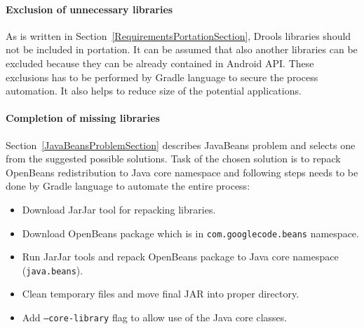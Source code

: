 \paragraph{Exclusion of unnecessary libraries}
As is written in Section~\ref{RequirementsPortationSection}, Drools libraries should not be included in portation. It
can be assumed that also another libraries can be excluded because they can be already contained in Android API. These
exclusions has to be performed by Gradle language to secure the process automation. It also helps to reduce size of the
potential applications.

\paragraph{Completion of missing libraries}
Section~\ref{JavaBeansProblemSection} describes JavaBeans problem and selects one from the suggested possible solutions.
Task of the chosen solution is to repack OpenBeans redistribution to Java core namespace and following steps needs to be
done by Gradle language to automate the entire process:
\begin{itemize}
\item Download JarJar tool for repacking libraries.
\item Download OpenBeans package which is in \texttt{com.googlecode.beans} namespace.
\item Run JarJar tools and repack OpenBeans package to Java core namespace (\texttt{java.beans}).
\item Clean temporary files and move final JAR into proper directory.
\item Add \texttt{--core-library} flag to allow use of the Java core classes.
\end{itemize}
